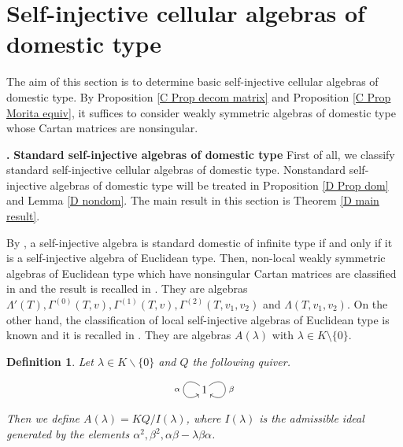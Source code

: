 \documentclass[12pt]{amsart}
\newtheorem{definition}[thm]{Definition}
\def \para{\refstepcounter{thm} \par\medskip\noindent
                \textbf{\thethm .} }
\numberwithin{equation}{thm}
\newcounter{ni}
\begin{document}
\section{Self-injective cellular algebras of domestic type} 

 The aim of this section is to determine basic self-injective cellular algebras of domestic type. 
By Proposition \ref{C Prop decom matrix} and Proposition \ref{C Prop Morita equiv},  
it suffices to consider weakly symmetric algebras of domestic type whose Cartan matrices are nonsingular. 
 
\para {\bf Standard self-injective algebras of domestic type}
First of all, we classify standard self-injective cellular algebras of domestic type. 
Nonstandard self-injective algebras of domestic type will be treated in Proposition \ref{D Prop dom} and Lemma \ref{D nondom}.
The main result in this section is Theorem \ref{D main result}. 

By \cite[Theorem 4.3]{S}, a self-injective algebra is standard domestic of infinite type 
if and only if it is a self-injective algebra of Euclidean type.
Then, non-local weakly symmetric algebras of Euclidean type which have nonsingular Cartan matrices are classified 
in \cite[Theorem 1]{BS} and the result is recalled in \cite[Theorem 1.1]{BHS}. They are
algebras $\Lambda'(T), \Gamma^{(0)}(T,v), \Gamma^{(1)}(T,v), \Gamma^{(2)}(T,v_1,v_2)$ and $\Lambda(T,v_1,v_2)$. 
On the other hand, the classification of local self-injective algebras of Euclidean type is known and 
it is recalled in \cite[Theorem 1.2]{BHS}. They are algebras $A(\lambda)$ with $\lambda\in K\setminus\{0\}$. 

\begin{definition}
Let $\lambda \in K\backslash \{0\}$ and $Q$ the following quiver. 
\[\begin{xy}
(0,0)*[o]+{1}="1",
\SelectTips{eu}{}
\ar @(lu,ld)"1";"1"_{\alpha}
\ar @(ru,rd)"1";"1"^{\beta}
\end{xy}\] 
Then we define $A(\lambda) = KQ/I(\lambda)$, where $I(\lambda)$ is the admissible ideal generated 
by the elements $\alpha^2,\beta^2,\alpha\beta-\lambda\beta\alpha$.
\end{definition}
\end{document}
